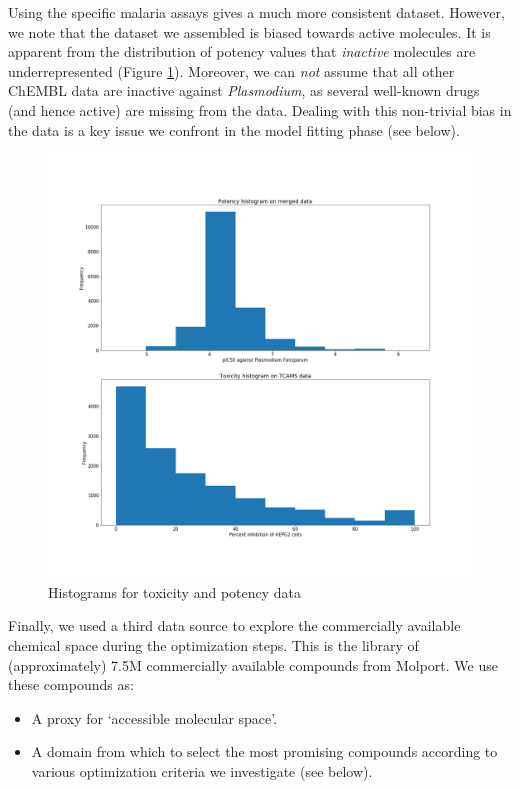 \documentclass{article}
\begin{document}
Using the specific malaria assays gives a much more consistent dataset.  However, we note that the dataset we assembled is biased towards active molecules. It is apparent from the distribution of potency values  that \textit{inactive} molecules are underrepresented (Figure \ref{fig:hist}).  Moreover, we can \textit{not} assume that all other ChEMBL data are inactive against \textit{Plasmodium}, as several well-known drugs (and hence active) are missing from the data. Dealing with this non-trivial bias in the data is a key issue we confront in the model fitting phase (see below).\newline

\begin{figure}[h!]
\centering
\includegraphics[width=\textwidth]{fig1_hists.png}
\caption{Histograms for toxicity and potency data}
\label{fig:hist}
\end{figure}

\newline
Finally, we used a third data source to explore the commercially available chemical space during the optimization steps.  This is the library of (approximately) 7.5M commercially available compounds from Molport.  We use these compounds as: \begin{itemize}
    \item A proxy for `accessible molecular space'.
    \item A domain from which to select the most promising compounds according to various optimization criteria we investigate (see below).
\end{itemize}
\end{document}
